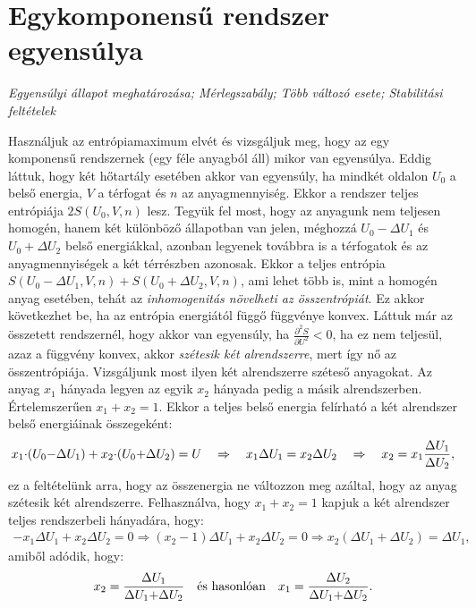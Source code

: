 \section{Egykomponensű rendszer egyensúlya}
\emph{Egyensúlyi állapot meghatározása; Mérlegszabály; Több változó esete; Stabilitási feltételek}

Használjuk az entrópiamaximum elvét és vizsgáljuk meg, hogy az egy komponensű rendszernek (egy féle anyagból áll) mikor van egyensúlya. Eddig láttuk, hogy két hőtartály esetében akkor van egyensúly, ha mindkét oldalon $U_0$ a belső energia, $V$ a térfogat és $n$ az anyagmennyiség. Ekkor a rendszer teljes entrópiája $2S(U_0,V,n)$ lesz. Tegyük fel most, hogy az anyagunk nem teljesen homogén, hanem két különböző állapotban van jelen, méghozzá $U_0{-}\Delta U_1$ és $U_0{+}\Delta U_2$ belső energiákkal, azonban legyenek továbbra is a térfogatok és az anyagmennyiségek a két térrészben azonosak. Ekkor a teljes entrópia $S(U_0{-}\Delta U_1,V,n)+S(U_0{+}\Delta U_2,V,n)$, ami lehet több is, mint a homogén anyag esetében, tehát az \emph{inhomogenitás növelheti az összentrópiát}. Ez akkor következhet be, ha az entrópia energiától függő függvénye konvex. Láttuk már az összetett rendszernél, hogy akkor van egyensúly, ha $\frac{\partial^2 S}{\partial U^2}<0$, ha ez nem teljesül, azaz a függvény konvex, akkor \emph{szétesik két alrendszerre}, mert így nő az összentrópiája. Vizsgáljunk most ilyen két alrendszerre széteső anyagokat. Az anyag $x_1$ hányada legyen az egyik $x_2$ hányada pedig a másik alrendszerben. Értelemszerűen $x_1+x_2=1$. Ekkor a teljes belső energia felírható a két alrendszer belső energiáinak összegeként:
\begin{align}
	x_1{\cdot}(U_0{-}\Delta U_1) + x_2{\cdot} (U_0{+}\Delta U_2) = U\quad\Rightarrow\quad x_1\Delta U_1 = x_2\Delta U_2 \quad\Rightarrow\quad x_2 =x_1\frac{\Delta U_1}{\Delta U_2}, 
\end{align}
ez a feltételünk arra, hogy az összenergia ne változzon meg azáltal, hogy az anyag szétesik két alrendszerre. Felhasználva, hogy $x_1+x_2 = 1$ kapjuk a két alrendszer teljes rendszerbeli hányadára, hogy:
\begin{align}
	-x_1\Delta U_1+x_2\Delta U_2 = 0\Rightarrow (x_2-1)\Delta U_1+x_2\Delta U_2=0\Rightarrow x_2(\Delta U_1+\Delta U_2) = \Delta U_1,
\end{align}
amiből adódik, hogy:
\begin{align}
	x_2 = \frac{\Delta U_1}{\Delta U_1{+}\Delta U_2}\quad\textnormal{és hasonlóan}\quad x_1 = \frac{\Delta U_2}{\Delta U_1{+}\Delta U_2}.
\end{align}
